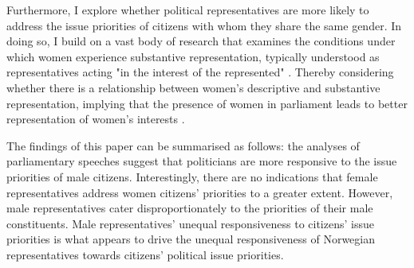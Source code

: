 Furthermore, I explore whether political representatives are more likely to address the issue priorities of citizens with whom they share the same gender. In doing so, I build on a vast body of research that examines the conditions under which women experience substantive representation, typically understood as representatives acting "in the interest of the represented" \parencite{pitkin_concept_1967,mansbridge_should_1999}. Thereby considering whether there is a relationship between women's descriptive and substantive representation, implying that the presence of women in parliament leads to better representation of women's interests \parencite{clayton_quotas_2017, bolzendahl_womens_2007, wangnerud_women_2009}. 

The findings of this paper can be summarised as follows: the analyses of parliamentary speeches suggest that politicians are more responsive to the issue priorities of male citizens. Interestingly, there are no indications that female representatives address women citizens’ priorities to a greater extent. However, male representatives cater disproportionately to the priorities of their male constituents. Male representatives' unequal responsiveness to citizens' issue priorities is what appears to drive the unequal responsiveness of Norwegian representatives towards citizens' political issue priorities. 
